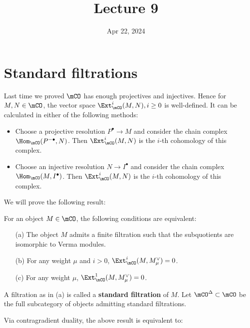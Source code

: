 





\title{Lecture 9}

\date{Apr 22, 2024}

\maketitle



\section{Standard filtrations}

	Last time we proved $\mCO$ has enough projectives and injectives. Hence for $M,N\in \mCO$, the vector space $\Ext_\mCO^i(M,N), i\ge 0$ is well-defined. It can be calculated in either of the following methods:
	\begin{itemize}
		\item 
			Choose a projective resolution $P^\bullet \to M$ and consider the chain complex $\Hom_\mCO(P^{-\bullet},N)$. Then $\Ext_\mCO^i(M,N)$ is the $i$-th cohomology of this complex.
		\item
			Choose an injective resolution $N\to I^\bullet$ and consider the chain complex $\Hom_\mCO(M,I^\bullet)$. Then $\Ext_\mCO^i(M,N)$ is the $i$-th cohomology of this complex.
	\end{itemize}

	We will prove the following result:

	\begin{thmdefn}
		\label{thmdefn-standard-fil}
		For an object $M \in \mCO$, the following conditions are equivalent:
		\begin{itemize}
			\item[(a)]
				The object $M$ admits a finite filtration such that the subquotients are isomorphic to Verma modules.
			\item[(b)]
				For any weight $\mu$ and $i>0$, $\Ext_\mCO^i(M,M_\mu^\vee) = 0$.
			\item[(c)]
				For any weight $\mu$, $\Ext_\mCO^1(M,M_\mu^\vee) = 0$.
		\end{itemize}
		A filtration as in (a) is called a \textbf{standard filtration} of $M$. Let $\mCO^\Delta\subset \mCO$ be the full subcategory of objects admitting standard filtrations.
	\end{thmdefn}
	
	Via contragradient duality, the above result is equivalent to:

